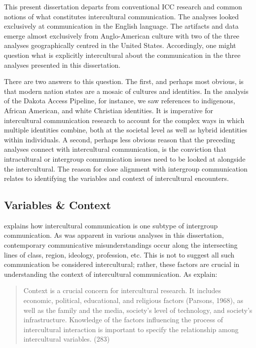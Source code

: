 This present dissertation departs from conventional ICC research and common notions of what constitutes intercultural communication. The analyses looked exclusively at communication in the English language. The artifacts and data emerge almost exclusively from Anglo-American culture with two of the three analyses geographically centred in the United States. Accordingly, one might question what is explicitly intercultural about the communication in the three analyses presented in this dissertation. 

There are two answers to this question. The first, and perhaps most obvious, is that modern nation states are a mosaic of cultures and identities. In the analysis of the Dakota Access Pipeline, for instance, we saw references to indigenous, African American, and white Christian identities. It is imperative for intercultural communication research to account for the complex ways in which multiple identities combine, both at the societal level as well as hybrid identities within individuals. A second, perhaps less obvious reason that the preceding analyses connect with intercultural communication, is the conviction that intracultural or intergroup communication issues need to be looked at alongside the intercultural. The reason for close alignment with intergroup communication relates to identifying the variables and context of intercultural encounters.

\subsection{Variables \& Context}

\cite{Gudykunst2001} explains how intercultural communication is one subtype of intergroup communication. As was apparent in various analyses in this dissertation, contemporary communicative misunderstandings occur along the intersecting lines of class, region, ideology, profession, etc. This is not to suggest all such communication be considered intercultural; rather, these factors are crucial in understanding the context of intercultural communication. As \cite{Barnett2001} explain:

\begin{quote}
Context is a crucial concern for intercultural research. It includes economic, political, educational, and religious factors (Parsons, 1968), as well as the family and the media, society's level of technology, and society's infrastructure. Knowledge of the factors influencing the process of intercultural interaction is important to specify the relationship among intercultural variables. (283) 
\end{quote}

